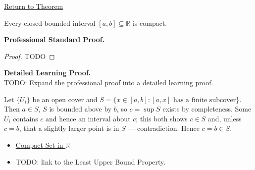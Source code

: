 \newpage
{}
\label{prf:closed-bounded-interval-compact}

\begin{remark*}[Return]
\hyperref[thm:closed-bounded-interval-compact]{Return to Theorem}
\end{remark*}

\begin{theorem*}
Every closed bounded interval $[a,b]\subseteq\mathbb{R}$ is compact.
\end{theorem*}

\textbf{Professional Standard Proof.}~\\
\begin{proof}
TODO
\end{proof}

\textbf{Detailed Learning Proof.}~\\
TODO: Expand the professional proof into a detailed learning proof.

\begin{remark*}
Let $\{U_i\}$ be an open cover and $S=\{x\in[a,b]:[a,x]\text{ has a finite subcover}\}$. Then $a\in S$, $S$ is bounded above by $b$, so $c=\sup S$ exists by completeness. Some $U_i$ contains $c$ and hence an interval about $c$; this both shows $c\in S$ and, unless $c=b$, that a slightly larger point is in $S$ --- contradiction. Hence $c=b\in S$.
\end{remark*}

\begin{dependencies}
\begin{itemize}
  \item \hyperref[def:compact-set]{Compact Set in $\mathbb{R}$}
  \item TODO: link to the Least Upper Bound Property.
\end{itemize}
\end{dependencies}
